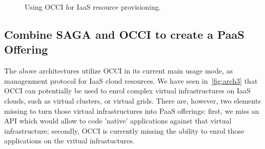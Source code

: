 \documentclass[10pt,conference,final,letterpaper,twoside,twocolumn,]{IEEEtran}
\newcommand{\T}[1]{\texttt{#1}}
\begin{document}
\begin{figure}[htb]
 \caption{\label{fig:arch2} Using OCCI for IaaS resource provisioning.}
\end{figure}





 \subsection{Combine SAGA and OCCI to create a PaaS Offering}

 The above architectures utilize OCCI in its current main usage mode,
 as managenment protocol for IaaS cloud resources.  We have seen
 in~\ref{fig:arch3} that OCCI can potentially be used to enrol complex
 virtual infrastructures on IaaS clouds, such as virtual clusters, or
 virtual grids.  There are, however, two elements missing to turn
 those virtual infrastructures into PaaS offerings: first, we miss an
 API which would allow to code 'native' applications against that
 virtual infrastructure; secondly, OCCI is currently missing the
 ability to enrol those applications on the vritual infrastuctures.
\end{document}
